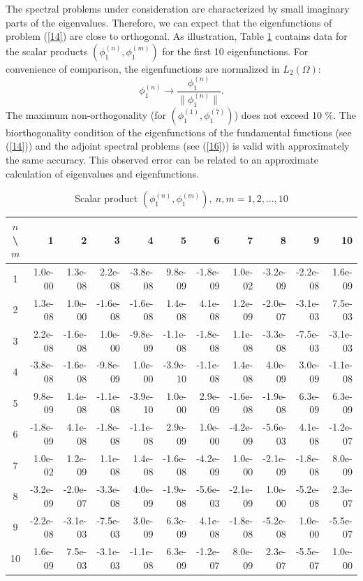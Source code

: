 \documentclass[authoryear]{elsarticle}
\begin{document}
The spectral problems under consideration are characterized by small imaginary parts of the eigenvalues. Therefore, we can expect that the eigenfunctions of problem (\ref{14}) 
are close to orthogonal. As illustration, Table \ref{t-5} contains data for the scalar products $(\phi_1^{(n)}, \phi_1^{(m)})$
for the first 10 eigenfunctions. For convenience of comparison, the eigenfunctions are normalized in $L_2(\Omega)$:
\[
 \phi_1^{(n)} \longrightarrow \frac{\phi_1^{(n)}}{\|\phi_1^{(n)}\|} .
\] 
The maximum non-orthogonality (for $(\phi_1^{(1)}, \phi_1^{(7)})$)
does not exceed 10 \%.
The biorthogonality condition of the eigenfunctions of the fundamental functions (see (\ref{14})) and the adjoint spectral problems (see (\ref{16})) is valid with approximately the same accuracy.
This observed error can be related to an approximate calculation of eigenvalues and eigenfunctions.

\begin{table}[h]
\caption{Scalar product $(\phi_1^{(n)}, \phi_1^{(m)}), \ n, m = 1,2, ..., 10$}
\label{t-5}
\begin{center}
\footnotesize 
\begin{tabular}{c|rrrrrrrrrr}
\hline
$n$\textbackslash$m$&1&2&3&4&5&6&7&8&9&10 \\
\hline
1 & 1.0e-00 & 1.3e-08 & 2.2e-08 & -3.8e-08 & 9.8e-09 & -1.8e-09 & 1.0e-02 & -3.2e-09 & -2.2e-08 & 1.6e-09 \\ 
2 & 1.3e-08 & 1.0e-00 & -1.6e-08 & -1.6e-08 & 1.4e-08 & 4.1e-08 & 1.2e-09 & -2.0e-07 & -3.1e-03 & 7.5e-03 \\ 
3 & 2.2e-08 & -1.6e-08 & 1.0e-00 & -9.8e-09 & -1.1e-08 & -1.8e-08 & 1.1e-08 & -3.3e-08 & -7.5e-03 & -3.1e-03 \\ 
4 & -3.8e-08 & -1.6e-08 & -9.8e-09 & 1.0e-00 & -3.9e-10 & -1.1e-08 & 1.4e-08 & 4.0e-09 & 3.0e-09 & -1.1e-08 \\ 
5 & 9.8e-09 & 1.4e-08 & -1.1e-08 & -3.9e-10 & 1.0e-00 & 2.9e-09 & -1.6e-08 & -1.9e-08 & 6.3e-09 & 6.3e-09 \\ 
6 & -1.8e-09 & 4.1e-08 & -1.8e-08 & -1.1e-08 & 2.9e-09 & 1.0e-00 & -4.2e-09 & -5.6e-03 & 4.1e-08 & -1.2e-07 \\ 
7 & 1.0e-02 & 1.2e-09 & 1.1e-08 & 1.4e-08 & -1.6e-08 & -4.2e-09 & 1.0e-00 & -2.1e-09 & -1.8e-08 & 8.0e-09 \\ 
8 & -3.2e-09 & -2.0e-07 & -3.3e-08 & 4.0e-09 & -1.9e-08 & -5.6e-03 & -2.1e-09 & 1.0e-00 & -5.2e-08 & 2.3e-07 \\ 
9 & -2.2e-08 & -3.1e-03 & -7.5e-03 & 3.0e-09 & 6.3e-09 & 4.1e-08 & -1.8e-08 & -5.2e-08 & 1.0e-00 & -5.5e-07 \\ 
10 & 1.6e-09 & 7.5e-03 & -3.1e-03 & -1.1e-08 & 6.3e-09 & -1.2e-07 & 8.0e-09 & 2.3e-07 & -5.5e-07 & 1.0e-00 \\ 
\hline
\end{tabular}
\end{center}
\end{table}
\end{document}
